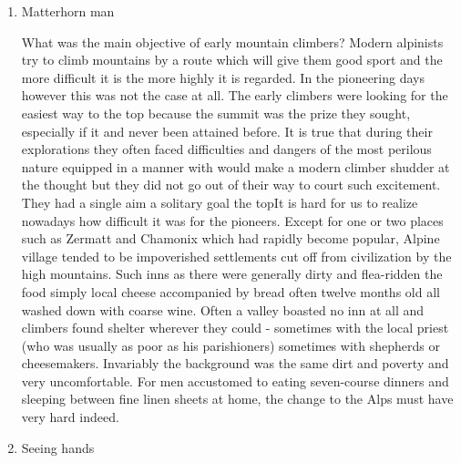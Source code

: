 \begin{enumerate}
\item Matterhorn man
                  
What was the main objective of early mountain climbers?  Modern alpinists try to climb mountains by a route which will give them good sport and the more difficult it is the more highly it is regarded.
In the pioneering days however this was not the case at all.
The early climbers were looking for the easiest way to the top because the summit was the prize they sought, especially if it and never been attained before.
It is true that during their explorations they often faced difficulties and dangers of the most perilous nature equipped in a manner with would make a modern climber shudder at the thought but they did not go out of their way to court such excitement.
They had a single aim a solitary goal  the topIt is hard for us to realize nowadays how difficult it was for the pioneers.
Except for one or two places such as Zermatt and Chamonix which had rapidly become popular, Alpine village tended to be impoverished settlements cut off from civilization by the high mountains.
Such inns as there were generally dirty and flea-ridden the food simply local cheese accompanied by bread often twelve months old all washed down with coarse wine.
Often a valley boasted no inn at all and climbers found shelter wherever they could - sometimes with the local priest (who was usually as poor as his parishioners) sometimes with shepherds or cheesemakers.
Invariably the background was the same dirt and poverty and very uncomfortable.
For men accustomed to eating seven-course dinners and sleeping between fine linen sheets at home, the change to the Alps must have very hard indeed.

\item  Seeing hands


\end{enumerate}
